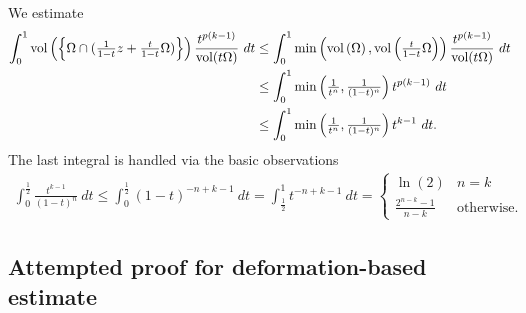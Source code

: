 \documentclass[10pt,a4paper]{article}
\begin{document}
\color{blue}
We estimate 
\begin{align*}
    \int_{0}^{1}
    \operatorname{vol}\left(\left\{ 
        \Omega \cap ( \tfrac{1}{1-t} z + \tfrac{t}{1-t} \Omega )
    \right\}\right)
    \frac{ t^{p(k-1)} }{ \operatorname{vol}(t\Omega) }
    \ dt
    &
    \leq 
    \int_{0}^{1}
    \min\left( 
        \operatorname{vol}\left(\Omega\right), 
        \operatorname{vol}\left( \tfrac{t}{1-t} \Omega \right) 
    \right)
    \frac{ t^{p(k-1)} }{ \operatorname{vol}(t\Omega) }
    \ dt
    \\&
    \leq 
    \int_{0}^{1}
    \min\left( \tfrac{1}{t^{n}}, \tfrac{1}{(1-t)^n} \right) 
    t^{p(k-1)} 
    \ dt
    \\&
    \leq 
    \int_{0}^{1}
    \min\left( \tfrac{1}{t^{n}}, \tfrac{1}{(1-t)^n} \right) 
    t^{k-1} 
    \ dt
    .
\end{align*}
The last integral is handled via the basic observations
\begin{align*}
    \int_{0}^{\frac 1 2} 
    \frac{ t^{k-1} }{ (1-t)^{n} }
    \ dt
    \leq 
    \int_{0}^{\frac 1 2} 
    (1-t)^{-n+k-1}
    \ dt
    =
    \int_{\frac 1 2}^{1} 
    t^{-n+k-1}
    \ dt
    =
    \begin{cases}
        \ln(2)                 & \text{$n=k$}
        \\
        \frac{2^{n-k}-1}{n-k} & \text{otherwise.}
    \end{cases}
\end{align*}









\subsection{Attempted proof for deformation-based estimate}
\end{document}
